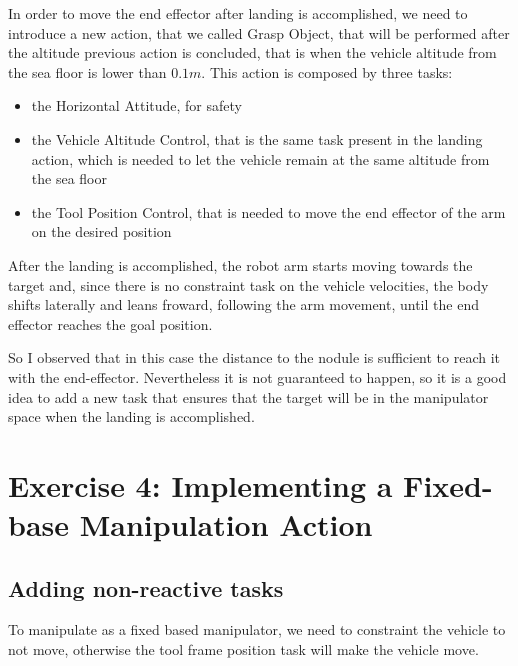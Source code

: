 \documentclass{article}
\begin{document}
In order to move the end effector after landing is accomplished, we need to introduce a new action, that we called Grasp Object, that will be performed after the altitude previous action is concluded, that is when the vehicle altitude from the sea floor is lower than \(0.1 m\). This action is composed by three tasks: 
\begin{itemize}
	\item the Horizontal Attitude, for safety
	\item the Vehicle Altitude Control, that is the same task present in the landing action, which is needed to let the vehicle remain at the same altitude from the sea floor
	\item the Tool Position Control, that is needed to move the end effector of the arm on the desired position
\end{itemize}
After the landing is accomplished, the robot arm starts moving towards the target and, since there is no constraint task on the vehicle velocities, the body shifts laterally and leans froward, following the arm movement, until the end effector reaches the goal position.

\begin{figure}[H]
	\centering
	\hspace{10mm}
	\label{im:v_land_grasp}
\end{figure} 
So I observed that in this case the distance to the nodule is sufficient to reach it with the end-effector. Nevertheless it is not guaranteed to happen, so it is a good idea to add a new task that ensures that the target will be in the manipulator space when the landing is accomplished.

\clearpage

\section{Exercise 4: Implementing a Fixed-base Manipulation Action}
\subsection{Adding non-reactive tasks}
To manipulate as a fixed based manipulator, we need to constraint the vehicle to not move, otherwise the tool frame position task will make the vehicle move.
\end{document}
